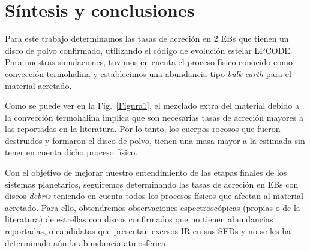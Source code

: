 \documentclass[baaa]{baaa}
\begin{document}
\section{Síntesis y conclusiones}

Para este trabajo determinamos las tasas de acreción en 2 EBs que tienen un disco de polvo
confirmado, utilizando el código de evolución estelar LPCODE. Para nuestras simulaciones, tuvimos en cuenta el proceso físico conocido como convección termohalina y establecimos una abundancia tipo {\em bulk earth} para el material acretado.

Como se puede ver en la Fig.~\ref{Figura1},  el mezclado extra del material debido a la convección termohalina implica que son necesarias tasas de acreción mayores a las reportadas en la literatura. Por lo tanto, los cuerpos rocosos que fueron destruidos y formaron el disco de polvo, tienen una masa mayor a la estimada sin tener en cuenta dicho proceso físico.

 Con el objetivo de mejorar nuestro entendimiento de las etapas finales de los sistemas planetarios, seguiremos determinando las tasas de acreción en EBs con discos {\em debris} teniendo en cuenta todos los procesos físicos que afectan al material acretado. Para ello, obtendremos observaciones espectroscópicas (propias o de la literatura) de estrellas con discos confirmados que no tienen abundancias reportadas, o 
 candidatas que presentan excesos IR en sus SEDs y no se les ha determinado aún la abundancia atmosférica.






\small

 
\end{document}
